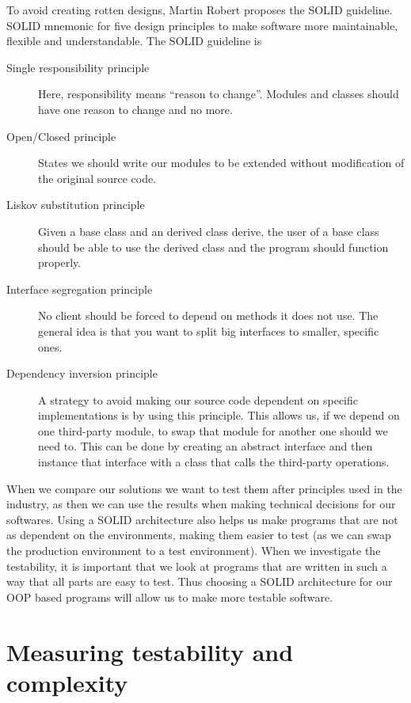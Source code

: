 To avoid creating rotten designs, Martin Robert proposes the SOLID guideline.
SOLID mnemonic for five design principles to make software more maintainable,
flexible and understandable. The SOLID guideline is

\begin{description}
    \item [Single responsibility principle] Here, responsibility means ``reason
        to change''. Modules and classes should have one reason to change and no
        more.
    \item [Open/Closed principle] States we should write our modules to be
        extended without modification of the original source code.
    \item [Liskov substitution principle] Given a base class and an derived
        class derive, the user of a base class should be able to use the derived
        class and the program should function properly.
    \item [Interface segregation principle] No client should be forced to depend
        on methods it does not use. The general idea is that you want to split
        big interfaces to smaller, specific ones.
    \item [Dependency inversion principle] A strategy to avoid making our source
        code dependent on specific implementations is by using this principle.
        This allows us, if we depend on one third-party module, to swap that
        module for another one should we need to. This can be done by creating
        an abstract interface and then instance that interface with a class that
        calls the third-party operations.~\cite{martinrobert}
\end{description}

When we compare our solutions we want to test them after principles used in the
industry, as then we can use the results when making technical decisions for our
softwares. Using a SOLID architecture also helps us make programs that are not
as dependent on the environments, making them easier to test (as we can swap the
production environment to a test environment). When we investigate the
testability, it is important that we look at programs that are written in such a
way that all parts are easy to test. Thus choosing a SOLID architecture for our
OOP based programs will allow us to make more testable software.

\section{Measuring testability and complexity}\label{measuretestability}

